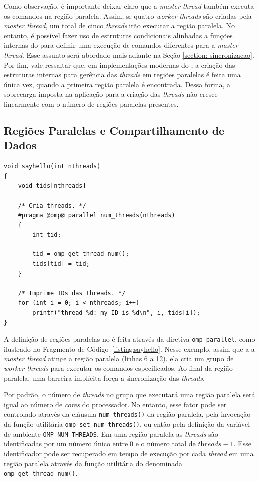 \documentclass{SBCbookchapter}
\begin{document}
		Como observação, é importante deixar claro que a \textit{master
		thread} também executa os comandos na região paralela. Assim, se
		quatro \textit{worker threads} são criadas pela \textit{master
		thread}, um total de cinco \textit{threads} irão executar a
		região paralela.  No entanto, é possível fazer uso de estruturas
		condicionais alinhadas a funções internas do \openmp para
		definir uma execução de comandos diferentes para a
		\textit{master thread}. Esse assunto será abordado mais adiante
		na Seção \ref{section: sincronizacao}. Por fim, vale ressaltar
		que, em implementações modernas do \openmp, a criação das
		estruturas internas para gerência das \textit{threads} em
		regiões paralelas é feita uma única vez, quando a primeira
		região paralela é encontrada. Dessa forma, a sobrecarga imposta
		na aplicação para a criação das \textit{threads} não cresce
		linearmente com o número de regiões paralelas presentes.

	\subsection{Regiões Paralelas e Compartilhamento de Dados}
	\label{subsection: regioes paralelas e compartilhamento de dados}

\begin{lstlisting}[frame=single,float,floatplacement=t,caption=Um exemplo simples com uma região paralela.,label=listing:sayhello] 
void sayhello(int nthreads)
{
	void tids[nthreads]

	/* Cria threads. */
	#pragma @omp@ parallel num_threads(nthreads)
	{
		int tid;

		tid = omp_get_thread_num();
		tids[tid] = tid;
	}

	/* Imprime IDs das threads. */
	for (int i = 0; i < nthreads; i++)
		printf("thread %d: my ID is %d\n", i, tids[i]);
}
\end{lstlisting}

		A definição de regiões paralelas no \openmp é feita através da
		diretiva \texttt{omp parallel}, como ilustrado no Fragmento
		de Código~\ref{listing:sayhello}.  Nesse exemplo, assim que a a
		\textit{master thread} atinge a região paralela (linhas 6 a 12),
		ela cria um grupo de \textit{worker threads} para executar os
		comandos especificados. Ao final da região paralela, uma
		barreira implícita força a sincronização das \textit{threads}.
		
		Por padrão, o número de \textit{threads} no grupo que executará
		uma região paralela será igual ao número de \textit{cores} do
		processador. No entanto, esse fator pode ser controlado através
		da cláusula \texttt{num\_threads()} da região paralela, pela invocação
		da função utilitária \texttt{omp\_set\_num\_threads()}, ou então pela definição da
		variável de ambiente \texttt{OMP\_NUM\_THREADS}. Em uma região
		paralela as \textit{threads} são identificadas por um número
		único entre $0$ e o número total de $\textit{threads} - 1$.
		Esse identificador pode ser recuperado em tempo de execução por
		cada \textit{thread} em uma região paralela através da função utilitária do
		\openmp denominada \texttt{omp\_get\_thread\_num()}.
\end{document}
